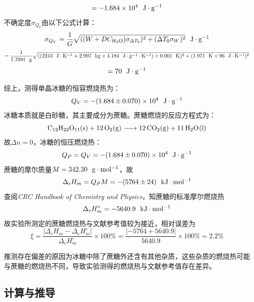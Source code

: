 \documentclass[12pt]{article}
\begin{document}
			$$
			=-1.684\times 10^{4}\ \ {\rm J\cdot g^{-1}}
			$$
			不确定度$\sigma_{Q_{V}}$由以下公式计算：
			$$
			\sigma_{Q_{V}}=\frac{1}{G}\sqrt{((W+DC_{\rm H_{2}O})\sigma_{\Delta T_{0}})^{2}+(\Delta T_{0}\sigma_{W})^{2}} \ \ {\rm J\cdot g^{-1}}
			$$
			$$
			=\frac{1}{1.7091\ \ {\rm g}}\sqrt{((2243\ \ {\rm J\cdot K^{-1}}+2.997\ \ {\rm kg}\times 4.184\ \ {\rm J\cdot g^{-1}\cdot K^{-1}})\times 0.001\ \ {\rm K})^{2}+(1.971\ \ {\rm K}\times 96\ \ {\rm J\cdot K^{-1}})^{2}}
			$$
			$$
			=70\ \ {\rm J\cdot g^{-1}}
			$$
			\par
			综上，测得单晶冰糖的恒容燃烧热为：
			$$
			Q_{V}=-(1.684\pm 0.070)\times 10^{4}\ \ {\rm J\cdot g^{-1}}
			$$
			冰糖本质就是白砂糖，其主要成分为蔗糖。蔗糖燃烧的反应方程式为：
			$$
			\ce{C12H22O11(s) +  12 O2(g) -> 12 CO2(g) + 11 H2O(l)}
			$$
			故$\Delta n=0$，冰糖的恒压燃烧热：
			$$
			Q_{P}=Q_{V}=-(1.684\pm 0.070)\times 10^{4}\ \ {\rm J\cdot g^{-1}}
			$$
			蔗糖的摩尔质量$M=342.30\ \ {\rm g\cdot mol^{-1}}$，故
			$$
			\Delta_{c}H_{m}=Q_{P}M=-(5764\pm 24)\ \ {\rm kJ\cdot mol^{-1}} 
			$$
			查阅\textit{CRC Handbook of Chemistry and Physics}\citealp{crc}，知蔗糖的标准摩尔燃烧热
			$$
			\Delta_{c}H^{\circ}_{m}=-5640.9\ \ {\rm kJ\cdot mol^{-1}}
			$$
			故实验所测定的蔗糖燃烧热与文献参考值较为接近，相对误差为
			$$
			\xi=\frac{|\Delta_{c}H_{m}-\Delta_{c}H^{\circ}_{m}|}{\Delta_{c}H^{\circ}_{m}}\times 100\%=\frac{|-5764+5640.9|}{5640.9}\times 100\%=2.2\%
			$$
			\par
			推测存在偏差的原因为冰糖中除了蔗糖外还含有其他杂质，这些杂质的燃烧热可能与蔗糖的燃烧热不同，导致实验测得的燃烧热与文献参考值存在差异。\par

			
		\subsection{计算与推导}
\end{document}
